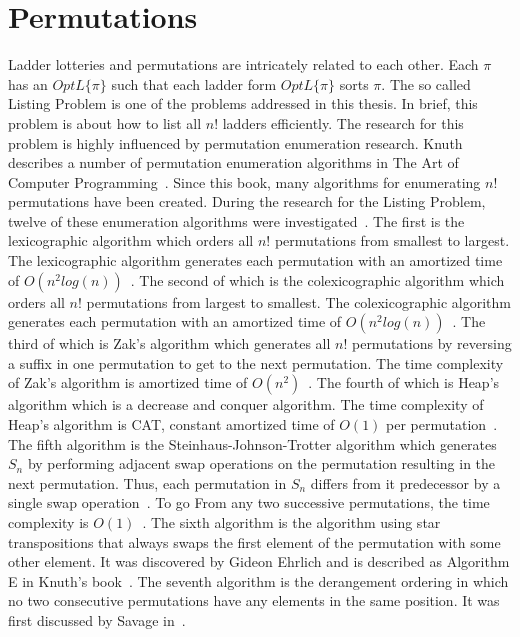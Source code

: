 \section{Permutations}
Ladder lotteries and permutations are intricately related to each other. Each $\pi$ has an $OptL\{\pi\}$ such that 
each ladder form $OptL\{\pi\}$ sorts $\pi$. The so called Listing Problem is one of the problems addressed in this thesis.
In brief, this problem is about how to list all $n!$ ladders efficiently. The research for this problem is highly influenced 
by permutation enumeration research. Knuth describes a number of 
permutation enumeration algorithms in The Art of Computer Programming~\cite{A18}. Since this book, many algorithms for 
enumerating $n!$ permutations have been created. During the research for the Listing Problem, twelve of these 
enumeration algorithms were investigated~\cite{A18}\cite{A19}\cite{A21}\cite{A24}\cite{A25}\cite{A26}\cite{A31}\cite{A34}\cite{A35}\cite{A36}\cite{A37}. 
The first is the lexicographic algorithm which orders all $n!$ permutations from smallest to largest. The lexicographic 
algorithm generates each permutation with an amortized time of $O(n^{2}log(n))$~\cite{A21}. The second of which is the 
colexicographic algorithm which orders all $n!$ permutations from largest to smallest. The colexicographic 
algorithm generates each permutation with an amortized time of $O(n^{2}log(n))$~\cite{A19}. The third of which is Zak's 
algorithm which generates all $n!$ permutations by reversing a suffix in one permutation to get to the next 
permutation. The time complexity of Zak's algorithm is amortized time of $O(n^{2})$~\cite{A31}.
The fourth of which is Heap's algorithm which is a decrease and conquer algorithm.  
The time complexity of Heap's algorithm is {\sc CAT}, constant amortized time of $O(1)$ per permutation~\cite{A24}.
The fifth algorithm is the Steinhaus-Johnson-Trotter algorithm which generates $S_{n}$ by performing adjacent swap operations 
on the permutation resulting in the next permutation. Thus, each permutation in $S_{n}$ differs 
from it predecessor by a single swap operation~\cite{A25}. To go From any two successive permutations, 
the time complexity is $O(1)$~\cite{A25}.
The sixth algorithm is the algorithm using star transpositions that always swaps the first element of the permutation 
with some other element. It was discovered by Gideon Ehrlich and is described as Algorithm E in Knuth's book~\cite{A18}.
The seventh algorithm is the derangement ordering in which no two consecutive permutations have any elements 
in the same position. It was first discussed by Savage in~\cite{A35}. 

